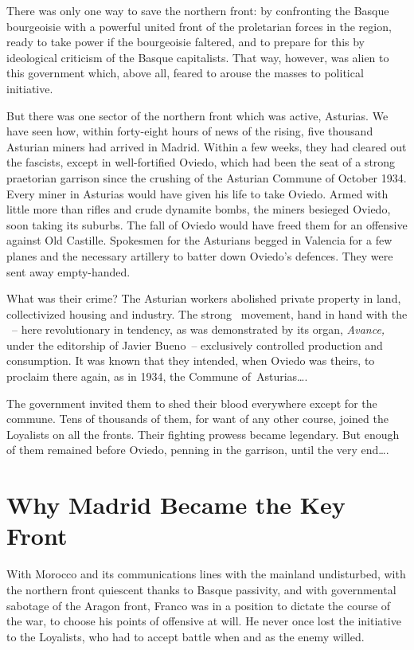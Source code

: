 There was only one way to save the northern front: by confronting the Basque bourgeoisie with a powerful united front of the proletarian forces in the region, ready to take power if the bourgeoisie faltered, and to prepare for this by ideological criticism of the Basque capitalists. That way\kn, however\kn, was alien to this government which, above all, feared to arouse the masses to political initiative.

\indexCNT\indexUGT{}
But there was one sector of the northern front which was active, Asturias. We have seen how, within forty-eight hours of news of the rising, five thousand Asturian miners had arrived in Madrid. Within a few weeks, they had cleared out the fascists, except in well-fortified Oviedo, which had been the seat of a strong praetorian garrison since the crushing of the Asturian Commune of October 1934. Every miner in Asturias would have given his life to take Oviedo. Armed with little more than rifles and crude dynamite bombs, the miners besieged Oviedo, soon taking its suburbs. The fall of Oviedo would have freed them for an offensive against Old Castille. Spokesmen for the Asturians begged in Valencia for a few planes and the necessary artillery to batter down Oviedo’s defences. They were sent away empty-handed.

What was their crime? The Asturian workers abolished private property in land, collectivized housing and industry. The strong \CNT\ movement, hand in hand with the \UGT~-- here revolutionary in tendency, as was demonstrated by its organ, \emph{Avance,} under the editorship of Javier Bueno~-- exclusively controlled production and consumption. It was known that they intended, when Oviedo was theirs, to proclaim there again, as in 1934, the Commune of~Asturias\dots.

The government invited them to shed their blood everywhere except for the commune. Tens of thousands of them, for want of any other course, joined the Loyalists on all the fronts. Their fighting prowess became legendary. But enough of them remained before Oviedo, penning in the garrison, until the very end\dots.

\section{Why Madrid Became the Key Front}

With Morocco and its communications lines with the mainland un\-dis\-turbed, with the northern front quiescent thanks to Basque passivity\kn, and with governmental sabotage of the Aragon front, Franco was in a position to dictate the course of the war\kn, to choose his points of offensive at will. He never once lost the initiative to the Loyalists, who had to accept battle when and as the enemy willed.

